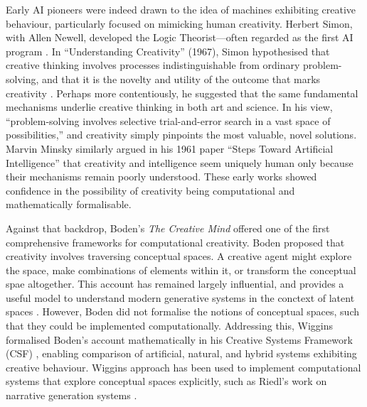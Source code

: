 Early AI pioneers were indeed drawn to the idea of machines exhibiting creative behaviour, particularly focused on mimicking human creativity. Herbert Simon, with Allen Newell, developed the Logic Theorist—often regarded as the first AI program \cite{Russell2016-oe}. In “Understanding Creativity” (1967), Simon hypothesised that creative thinking involves processes indistinguishable from ordinary problem-solving, and that it is the novelty and utility of the outcome that marks creativity \cite{Simon1967-nr}. Perhaps more contentiously, he suggested that the same fundamental mechanisms underlie creative thinking in both art and science. In his view, “problem-solving involves selective trial-and-error search in a vast space of possibilities,” and creativity simply pinpoints the most valuable, novel solutions. Marvin Minsky similarly argued in his 1961 paper “Steps Toward Artificial Intelligence” that creativity and intelligence seem uniquely human only because their mechanisms remain poorly understood. These early works showed confidence in the possibility of creativity being computational and mathematically formalisable. 

Against that backdrop, Boden’s \emph{The Creative Mind} offered one of the first comprehensive frameworks for computational creativity. Boden proposed that creativity involves traversing conceptual spaces. A creative agent might explore the space, make combinations of elements within it, or transform the conceptual spae altogether. This account has remained largely influential, and provides a useful model to understand modern generative systems in the conctext of latent spaces \cite{Boden2003-hk}. However, Boden did not formalise the notions of conceptual spaces, such that they could be implemented computationally. Addressing this, Wiggins formalised Boden’s account mathematically in his Creative Systems Framework (CSF) \cite{Wiggins2006-zd}, enabling comparison of artificial, natural, and hybrid systems exhibiting creative behaviour. Wiggins approach has been used to implement computational systems that explore conceptual spaces explicitly, such as Riedl's work on narrative generation systems \cite{Riedl2006-dm}.


